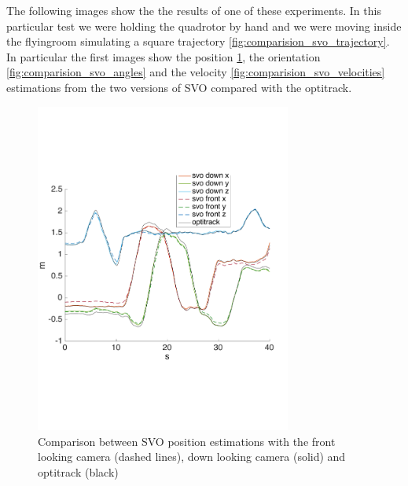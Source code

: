 The following images show the the results of one of these experiments. In this particular test we were holding the quadrotor by hand and we were moving inside the flyingroom simulating a square trajectory \ref{fig:comparision_svo_trajectory}.\\
In particular the first images show the position \ref{fig:comparision_svo_position}, the orientation  \ref{fig:comparision_svo_angles} and the velocity \ref{fig:comparision_svo_velocities} estimations from the two versions of SVO compared with the optitrack.
 
\begin{figure}[!ht]
    \centering
    \includegraphics[width=0.75\textwidth]{img/comparision_between_two_svo_and_opti_position.pdf}
    \caption{Comparison between SVO position estimations with the front looking camera (dashed lines), down looking camera (solid) and optitrack (black) }
    \label{fig:comparision_svo_position}
\end{figure}

